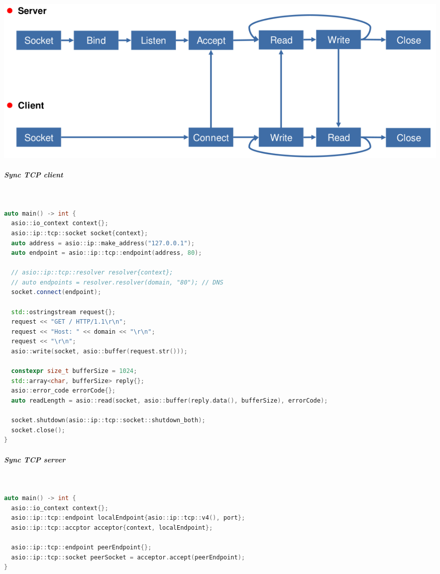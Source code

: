 \documentclass[11pt,twoside,landscape]{article}
\begin{document}
\begin{multicols}{2}
{
\begin{center}
\includegraphics[width=.9\linewidth]{img/connection_oriented_communication_pattern.png}
\end{center}
\label{tbl:connection-oriented-communication-pattern-using-sockets}
}
\subparagraph{Sync TCP client} \
\label{sec:orgd2c10e1}
\begin{lstlisting}[language=c++,label=lst:client-connection-example-using-asio,caption={Client connection example using ASIO},captionpos=b,numbers=none]
auto main() -> int {
  asio::io_context context{};
  asio::ip::tcp::socket socket{context};
  auto address = asio::ip::make_address("127.0.0.1");
  auto endpoint = asio::ip::tcp::endpoint(address, 80);

  // asio::ip::tcp::resolver resolver{context};
  // auto endpoints = resolver.resolver(domain, "80"); // DNS
  socket.connect(endpoint);

  std::ostringstream request{};
  request << "GET / HTTP/1.1\r\n";
  request << "Host: " << domain << "\r\n";
  request << "\r\n";
  asio::write(socket, asio::buffer(request.str()));

  constexpr size_t bufferSize = 1024;
  std::array<char, bufferSize> reply{};
  asio::error_code errorCode{};
  auto readLength = asio::read(socket, asio::buffer(reply.data(), bufferSize), errorCode);

  socket.shutdown(asio::ip::tcp::socket::shutdown_both);
  socket.close();
}
\end{lstlisting}

\subparagraph{Sync TCP server} \
\label{sec:orgb34021d}
\begin{lstlisting}[language=c++,label=lst:server-example-using-asio,caption={Server example using ASIO},captionpos=b,numbers=none]
auto main() -> int {
  asio::io_context context{};
  asio::ip::tcp::endpoint localEndpoint{asio::ip::tcp::v4(), port};
  asio::ip::tcp::accptor acceptor{context, localEndpoint};

  asio::ip::tcp::endpoint peerEndpoint{};
  asio::ip::tcp::socket peerSocket = acceptor.accept(peerEndpoint);
}
\end{lstlisting}


\end{multicols}
\end{document}
